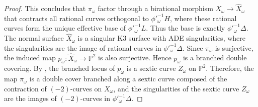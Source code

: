 \documentclass[12pt,reqno,a4paper]{amsart}
\theoremstyle{remark}
\theoremstyle{definition}
\begin{document}
\begin{proof}
    This concludes that $\pi_\omega$ factor through a birational morphism $X_\omega \to \widehat{X}_\omega$ that contracts all rational curves orthogonal to $\phi'^{-1}_\omega H$, where these rational curves form the unique effective base of $\phi'^{-1}_\omega L$. Thus the base is exactly $\phi'^{-1}_\omega \Delta$.
    The normal surface $\widehat{X}_\omega$ is a singular K3 surface with ADE singularities, where the singularities are the image of rational curves in $\phi'^{-1}_\omega \Delta$.
    Since $\pi_\omega$ is surjective, the induced map $p_\omega\colon \widehat{X}_\omega \to \mathbb{P}^2$ is also surjective.
            Hence $p_\omega$ is a branched double covering.
    By \cite[III, \S 7, Theorem 7.2]{barth2004compact}, the branched locus of $p_\omega$ is a sextic curve $Z_\omega$ on $\mathbb{P}^2$.
    Therefore, the map $\pi_\omega$ is a double cover branched along a sextic curve composed of the contraction of $(-2)$-curves on $X_\omega$, and the singularities of the sextic curve $Z_\omega$ are the images of $(-2)$-curves in $\phi'^{-1}_\omega \Delta$.
\end{proof}
\end{document}
